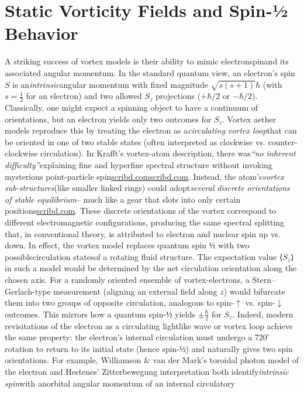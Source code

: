 \section*{Static Vorticity Fields and Spin‐½ Behavior}
A striking success of vortex models is their ability to mimic electronspinand its associated angular momentum. In the standard quantum view, an electron’s spin $S$ is an\textit{intrinsic}angular momentum with fixed magnitude $\sqrt{s(s+1)}\hbar$ (with $s=\tfrac{1}{2}$ for an electron) and two allowed $S_z$ projections ($+\hbar/2$ or $-\hbar/2$). Classically, one might expect a spinning object to have a continuum of orientations, but an electron yields only two outcomes for $S_z$. Vortex aether models reproduce this by treating the electron as a\textit{circulating vortex loop}that can be oriented in one of two stable states (often interpreted as clockwise vs. counter-clockwise circulation). In Krafft’s vortex-atom description, there was\textit{“no inherent difficulty”}explaining fine and hyperfine spectral structure without invoking mysterious point-particle spin\href{https://www.scribd.com/document/310197123/Ether-and-Mater-by-Carl-Krafft-pdf#:~:text=structure%2C%20the%20nuclear%20theory%20assumes,that%20the%20electrons%20can}{scribd.com}\href{https://www.scribd.com/document/310197123/Ether-and-Mater-by-Carl-Krafft-pdf#:~:text=There%20are%20no%20such%20inherent,difficulties%20in%20accounting%20for}{scribd.com}. Instead, the atom’s\textit{vortex sub-structures}(like smaller linked rings) could adopt\textit{several discrete orientations of stable equilibrium}– much like a gear that slots into only certain positions\href{https://www.scribd.com/document/310197123/Ether-and-Mater-by-Carl-Krafft-pdf#:~:text=There%20are%20no%20such%20inherent,difficulties%20in%20accounting%20for}{scribd.com}. These discrete orientations of the vortex correspond to different electromagnetic configurations, producing the same spectral splitting that, in conventional theory, is attributed to electron and nuclear spin up vs. down. In effect, the vortex model replaces quantum spin $½$ with two possiblecirculation statesof a rotating fluid structure. The expectation value ⟨$S_z$⟩ in such a model would be determined by the net circulation orientation along the chosen axis. For a randomly oriented ensemble of vortex-electrons, a Stern–Gerlach-type measurement (aligning an external field along $z$) would bifurcate them into two groups of opposite circulation, analogous to spin-$↑$ vs. spin-$↓$ outcomes. This mirrors how a quantum spin-$½$ yields $\pm\tfrac{\hbar}{2}$ for $S_z$. Indeed, modern revisitations of the electron as a circulating lightlike wave or vortex loop achieve the same property: the electron’s internal circulation must undergo a $720^\circ$ rotation to return to its initial state (hence spin-$½$) and naturally gives two spin orientations. For example, Williamson & van der Mark’s toroidal photon model of the electron and Hestenes’ Zitterbewegung interpretation both identify\textit{intrinsic spin}with anorbital angular momentum of an internal circulatory 